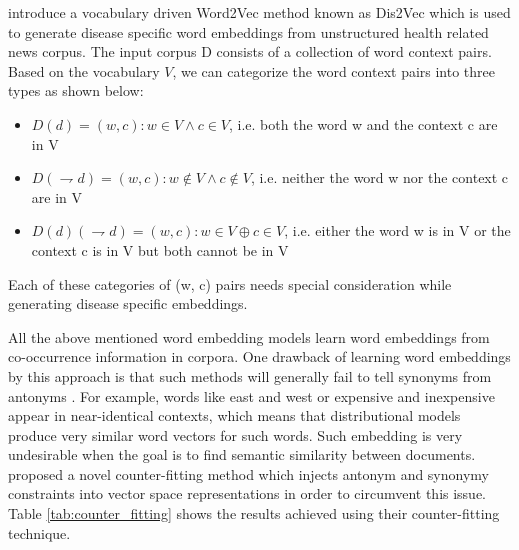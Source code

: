  \citet{ghosh2016characterizing} introduce a vocabulary driven Word2Vec method known as Dis2Vec which is
 used to generate disease specific word embeddings from unstructured health
 related news corpus. The input corpus D consists of a collection of word context pairs. Based on the vocabulary $V$, we can categorize the word context pairs into three types as shown
 below:
 \\
 \begin{itemize}
 	\item $ D(d) = {(w, c): w \in V ∧c \in V }$, i.e. both the word w and the context c are in V
 	\item $D(\rightharpoondown d) = {(w, c): w \notin V ∧c \notin V }$, i.e. neither the word w nor the context c are in V
 	\item $D(d)(\rightharpoondown d) = {(w, c): w \in V \oplus c \in V }$, i.e. either the word w is in V or the context c is in V but both cannot be in V
 \end{itemize}
 
 Each of these categories of (w, c) pairs
 needs special consideration while generating disease specific embeddings.
 
 
 All the above mentioned word embedding models learn word embeddings from co-occurrence information in corpora.
 One drawback of learning word embeddings by this approach is that such methods will generally fail to tell synonyms from
 antonyms \citep{mohammad2008computing}. For example, words like east and west
 or expensive and inexpensive appear in near-identical contexts, which means
 that distributional models produce very similar word vectors for such words. Such embedding is very undesirable when the goal is to find semantic similarity between documents. 
 \citet{mrksic:2016:naacl} proposed a novel counter-fitting method which injects antonym and
 synonymy constraints into vector space representations in order to circumvent this issue. Table \ref{tab:counter_fitting} shows the results \citet{mrksic:2016:naacl} achieved using their counter-fitting technique.
 
